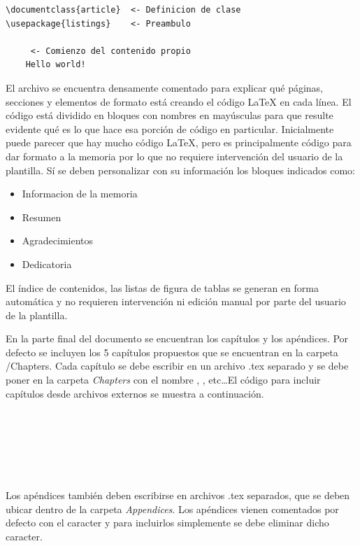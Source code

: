 \begin{lstlisting}
\documentclass{article}  <- Definicion de clase
\usepackage{listings}	 <- Preambulo

	 <- Comienzo del contenido propio 
	Hello world!

\end{lstlisting}


El archivo  se encuentra densamente comentado para explicar qué páginas, secciones y elementos de formato está creando el código \LaTeX{} en cada línea. El código está dividido en bloques con nombres en mayúsculas para que resulte evidente qué es lo que hace esa porción de código en particular. Inicialmente puede parecer que hay mucho código \LaTeX{}, pero es principalmente código para dar formato a la memoria por lo que no requiere intervención del usuario de la plantilla.  Sí se deben personalizar con su información los bloques indicados como:

\begin{itemize}
	\item Informacion de la memoria
	\item Resumen
	\item Agradecimientos
	\item Dedicatoria
\end{itemize}

El índice de contenidos, las listas de figura de tablas se generan en forma automática y no requieren intervención ni edición manual por parte del usuario de la plantilla. 

En la parte final del documento se encuentran los capítulos y los apéndices.  Por defecto se incluyen los 5 capítulos propuestos que se encuentran en la carpeta /Chapters. Cada capítulo se debe escribir en un archivo .tex separado y se debe poner en la carpeta \emph{Chapters} con el nombre , , etc\ldots El código para incluir capítulos desde archivos externos se muestra a continuación.

\begin{verbatim}
	
	 
	
	 
	 
\end{verbatim}

Los apéndices también deben escribirse en archivos .tex separados, que se deben ubicar dentro de la carpeta \emph{Appendices}. Los apéndices vienen comentados por defecto con el caracter \code{\%} y para incluirlos simplemente se debe eliminar dicho caracter.

